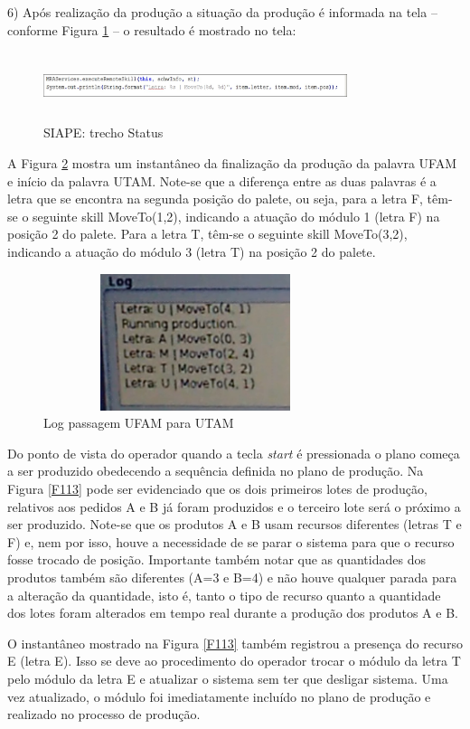 \documentclass[10pt,letterpaper,twocolumn]{IEEEtran}
\begin{document}
	6) Após realização da produção a situação da produção é informada na tela -- conforme Figura 
	\ref{F153} -- o resultado é mostrado no tela:
	
	\begin{figure}[!h]
		\centering
		\includegraphics[width=8.9cm, height=2cm]{MeDSE_imagens/F153_PrintStatus.jpg} 
		\caption{SIAPE: trecho Status}
		\label{F153}
	\end{figure}
	
	A Figura \ref{F146} mostra um instantâneo da finalização da produção da palavra UFAM e início da palavra
	UTAM. Note-se que a diferença entre as duas palavras é a letra que se encontra na segunda posição do 
	palete, ou seja, para a letra F, têm-se o seguinte skill MoveTo(1,2), indicando a atuação do módulo 1 
	(letra F) na posição 2 do palete. Para a letra T, têm-se o seguinte skill MoveTo(3,2), indicando a 
	atuação do módulo 3 (letra T) na posição 2 do palete.
	
	\begin{figure}[!h]
		\centering
		\includegraphics[width=8.9cm, height=4cm]{MeDSE_imagens/F146_LOG.jpg} 
		\caption{Log passagem UFAM para UTAM}
		\label{F146}
	\end{figure}
	
	
	Do ponto de vista do operador quando a tecla \textit{start} é pressionada o plano começa a ser produzido
	obedecendo a sequência definida no plano de produção. Na Figura \ref{F113} pode ser evidenciado que os 
	dois primeiros lotes de produção, relativos aos pedidos A e B já foram produzidos e o terceiro lote será 
	o próximo a ser produzido. Note-se que os produtos A e B usam recursos diferentes (letras T e F) e, nem 
	por isso, houve a necessidade de se parar o sistema para que o recurso fosse trocado de posição. Importante 
	também notar que as quantidades dos produtos também são diferentes (A=3 e B=4) e não houve qualquer parada
	para a alteração da quantidade, isto é, tanto o tipo de recurso quanto a quantidade dos lotes foram alterados 
	em tempo real durante a produção dos produtos A e B.\par 
	O instantâneo mostrado na Figura \ref{F113} também registrou a presença do recurso E (letra E). Isso se 
	deve ao procedimento do operador trocar o módulo da letra T pelo módulo da letra E e atualizar o sistema 
	sem ter que desligar  sistema. Uma vez atualizado, o módulo foi imediatamente incluído no plano de produção
	e realizado no processo de produção.  
	
\end{document}

